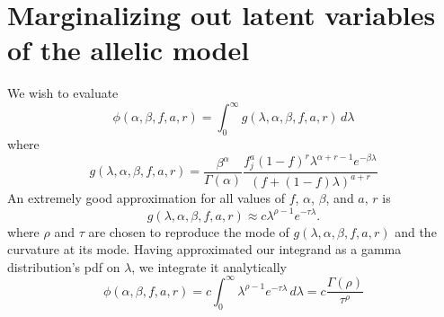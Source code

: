\documentclass[nofootinbib,amssymb,amsmath]{revtex4}
\begin{document}
\section{Marginalizing out latent variables of the allelic model} \label{marginalizing}
We wish to evaluate
%
\begin{equation}
\phi(\alpha, \beta, f, a, r) = \int_0^\infty g(\lambda, \alpha, \beta, f, a, r) \, d \lambda 
\end{equation}
%
where
%
\begin{equation}
g(\lambda, \alpha, \beta, f, a, r) =  \frac{\beta^\alpha}{\Gamma(\alpha)}  \frac{ f_j^{a} (1 - f)^{r}  \lambda^{\alpha + r - 1} e^{-\beta \lambda}}{ \left( f + (1-f) \lambda \right)^{a+r}} 
\end{equation}
%
An extremely good approximation for all values of $f$, $\alpha$, $\beta$, and $a, \, r$ is
\begin{equation}
g(\lambda, \alpha, \beta, f, a, r) \approx c \lambda^{\rho - 1} e^{-\tau \lambda}.
\end{equation}
where $\rho$ and $\tau$ are chosen to reproduce the mode of $g(\lambda, \alpha, \beta, f, a, r)$ and the curvature at its mode.  Having approximated our integrand as a gamma distribution's pdf on $\lambda$, we integrate it analytically
%
\begin{equation}
\phi(\alpha, \beta, f, a, r) = c \int_0^\infty \lambda^{\rho - 1} e^{-\tau \lambda} \, d \lambda = c \frac{\Gamma(\rho)}{\tau^\rho}
\end{equation}
%
\end{document}
